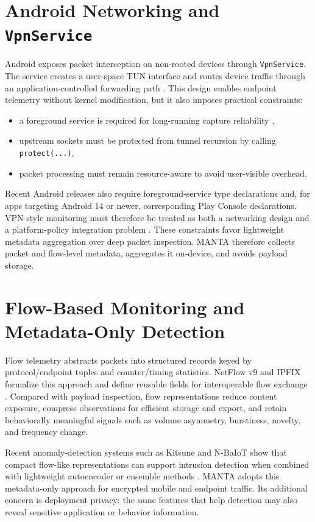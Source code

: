 \section{Android Networking and \texttt{VpnService}}
Android exposes packet interception on non-rooted devices through \texttt{VpnService}. The service
creates a user-space TUN interface and routes device traffic through an application-controlled
forwarding path \citep{android_vpnservice}. This design enables endpoint telemetry without kernel
modification, but it also imposes practical constraints:
\begin{itemize}[leftmargin=*]
  \item a foreground service is required for long-running capture reliability
  \citep{android_foreground_services},
  \item upstream sockets must be protected from tunnel recursion by calling
  \texttt{protect(...)},
  \item packet processing must remain resource-aware to avoid user-visible overhead.
\end{itemize}
Recent Android releases also require foreground-service type declarations and, for apps targeting
Android 14 or newer, corresponding Play Console declarations. VPN-style monitoring must therefore
be treated as both a networking design and a platform-policy integration problem
\citep{android_foreground_service_types}.
These constraints favor lightweight metadata aggregation over deep packet inspection. MANTA
therefore collects packet and flow-level metadata, aggregates it on-device, and avoids payload
storage.

\section{Flow-Based Monitoring and Metadata-Only Detection}
Flow telemetry abstracts packets into structured records keyed by protocol/endpoint tuples and
counter/timing statistics. NetFlow v9 and IPFIX formalize this approach and define reusable fields
for interoperable flow exchange \citep{rfc3954,rfc7011,rfc7012,iana_ipfix}. Compared with payload
inspection, flow representations reduce content exposure, compress observations for efficient
storage and export, and retain behaviorally meaningful signals such as volume asymmetry,
burstiness, novelty, and frequency change.

Recent anomaly-detection systems such as Kitsune and N-BaIoT show that compact flow-like
representations can support intrusion detection when combined with lightweight autoencoder or
ensemble methods \citep{kitsune_2018,n_baiot_2018}. MANTA adopts this metadata-only approach for
encrypted mobile and endpoint traffic. Its additional concern is deployment privacy: the same
features that help detection may also reveal sensitive application or behavior information.

